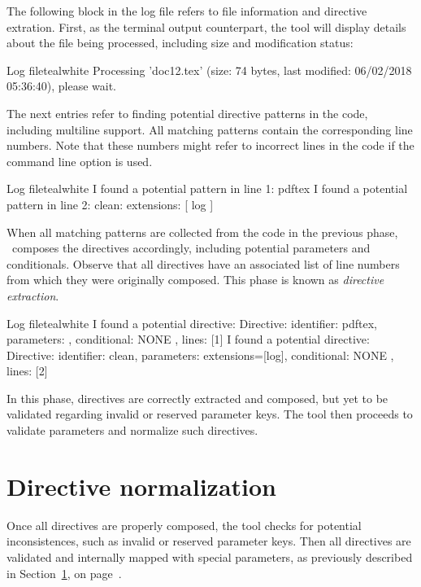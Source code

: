 The following block in the log file refers to file information and directive extration. First, as the terminal output counterpart, the tool will display details about the file being processed, including size and modification status:

\begin{codebox}{Log file}{teal}{\icnote}{white}
Processing 'doc12.tex' (size: 74 bytes, last modified:
06/02/2018 05:36:40), please wait.
\end{codebox}

The next entries refer to finding potential directive patterns in the code, including multiline support. All matching patterns contain the corresponding line numbers. Note that these numbers might refer to incorrect lines in the code if the  command line option is used.

\begin{codebox}{Log file}{teal}{\icnote}{white}
I found a potential pattern in line 1: pdftex
I found a potential pattern in line 2: clean: { extensions: [ log ] }
\end{codebox}

When all matching patterns are collected from the code in the previous phase, \arara\ composes the directives accordingly, including potential parameters and conditionals. Observe that all directives have an associated list of line numbers from which they were originally composed. This phase is known as \emph{directive extraction}.

\begin{codebox}{Log file}{teal}{\icnote}{white}
I found a potential directive: Directive: { identifier: pdftex,
parameters: {}, conditional: { NONE }, lines: [1] }
I found a potential directive: Directive: { identifier: clean,
parameters: {extensions=[log]}, conditional: { NONE }, lines: [2] }
\end{codebox}

In this phase, directives are correctly extracted and composed, but yet to be validated regarding invalid or reserved parameter keys. The tool then proceeds to validate parameters and normalize such directives.

\section{Directive normalization}
\label{sec:directivenormalization}

Once all directives are properly composed, the tool checks for potential inconsistences, such as invalid or reserved parameter keys. Then all directives are validated and internally mapped with special parameters, as previously described in Section~\ref{sec:directivenormalization}, on page~\pageref{sec:directivenormalization}.

